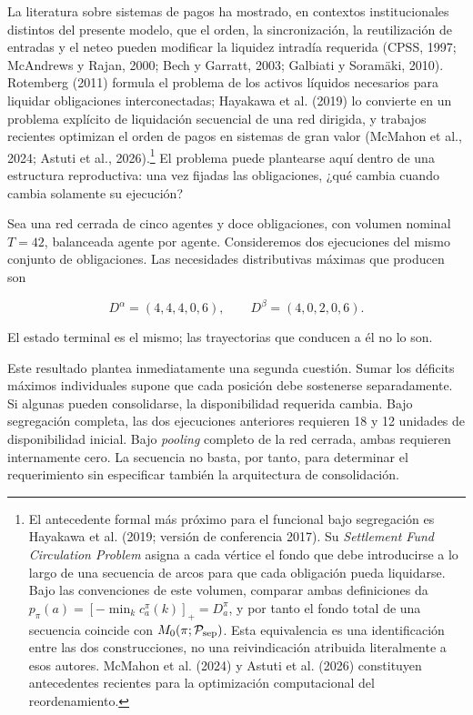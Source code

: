 \documentclass[10pt,a5paper,twoside]{article}
\begin{document}
La literatura sobre sistemas de pagos ha mostrado, en contextos
institucionales distintos del presente modelo, que el orden, la
sincronización, la reutilización de entradas y el neteo pueden modificar la
liquidez intradía requerida (CPSS, 1997; McAndrews y Rajan, 2000; Bech y
Garratt, 2003; Galbiati y Soramäki, 2010). Rotemberg (2011) formula el
problema de los activos líquidos necesarios para liquidar obligaciones
interconectadas; Hayakawa et al. (2019) lo convierte en un problema explícito
de liquidación secuencial de una red dirigida, y trabajos recientes optimizan
el orden de pagos en sistemas de gran valor (McMahon et al., 2024; Astuti et
al., 2026).\footnote{El antecedente formal más próximo para el funcional bajo segregación es
Hayakawa et al. (2019; versión de conferencia 2017). Su \emph{Settlement Fund
Circulation Problem} asigna a cada vértice el fondo que debe introducirse a lo
largo de una secuencia de arcos para que cada obligación pueda liquidarse. Bajo
las convenciones de este volumen, comparar ambas definiciones da
\(p_\pi(a)=[-\min_k c_a^\pi(k)]_+=D_a^\pi\), y por tanto el fondo total de
una secuencia coincide con \(M_0(\pi;\mathcal P_{\rm sep})\). Esta
equivalencia es una identificación entre las dos construcciones, no una
reivindicación atribuida literalmente a esos autores. McMahon et al. (2024) y
Astuti et al. (2026) constituyen antecedentes recientes para la optimización
computacional del reordenamiento.} El problema puede plantearse aquí dentro de
una estructura reproductiva: una vez fijadas las obligaciones, ¿qué cambia
cuando cambia solamente su ejecución?

Sea una red cerrada de cinco agentes y doce obligaciones, con volumen nominal
\(T=42\), balanceada agente por agente. Consideremos dos ejecuciones del mismo
conjunto de obligaciones. Las necesidades distributivas máximas que producen
son

\[
D^\alpha=(4,4,4,0,6),
\qquad
D^\beta=(4,0,2,0,6).
\]

El estado terminal es el mismo; las trayectorias que conducen a él no lo son.

Este resultado plantea inmediatamente una segunda cuestión. Sumar los
déficits máximos individuales supone que cada posición debe sostenerse
separadamente. Si algunas pueden consolidarse, la disponibilidad requerida
cambia. Bajo segregación completa, las dos ejecuciones anteriores requieren
18 y 12 unidades de disponibilidad inicial. Bajo \emph{pooling} completo de
la red cerrada, ambas requieren internamente cero. La secuencia no basta, por
tanto, para determinar el requerimiento sin especificar también la
arquitectura de consolidación.
\end{document}
